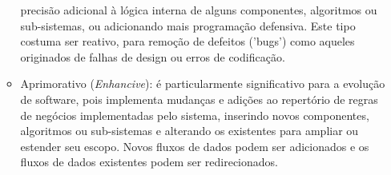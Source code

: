 \begin{itemize}
\begin{itemize}
        precisão adicional à lógica interna de alguns componentes, algoritmos ou sub-sistemas, ou 
        adicionando mais programação defensiva. Este tipo costuma ser reativo, para remoção de defeitos 
        ('bugs') como aqueles originados de falhas de design ou erros de codificação.
        \item Aprimorativo (\textit{Enhancive}): é particularmente significativo para a evolução de software, pois implementa 
        mudanças e adições ao repertório de regras de negócios implementadas pelo sistema, inserindo 
        novos componentes, algoritmos ou sub-sistemas e alterando os existentes para ampliar ou estender 
        seu escopo. Novos fluxos de dados podem ser adicionados e os fluxos de dados existentes podem 
        ser redirecionados.
    \end{itemize}
\end{itemize}
